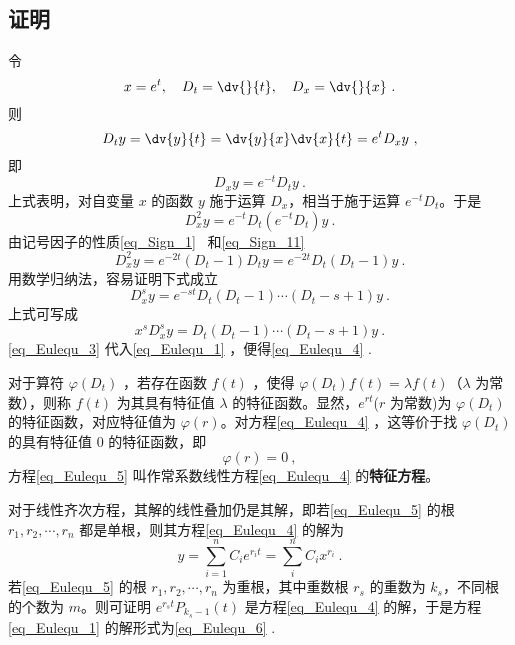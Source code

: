 \subsection{证明}
令
\begin{equation}
x=e^t,\quad D_t=\dv{}{t},\quad D_x=\dv{}{x}~.
\end{equation}
则
\begin{equation}
D_ty=\dv{y}{t}=\dv{y}{x}\dv{x}{t}=e^tD_xy~,
\end{equation}
即
\begin{equation}
D_xy=e^{-t}D_ty~.
\end{equation}
上式表明，对自变量 $x$ 的函数 $y$ 施于运算 $D_x$，相当于施于运算 $e^{-t}D_t$。于是
\begin{equation}
D_x^2y=e^{-t}D_t(e^{-t}D_t)y~.
\end{equation}
由记号因子的性质\autoref{eq_Sign_1}~ 和\autoref{eq_Sign_11}~
\begin{equation}
D_x^2y=e^{-2t}(D_t-1)D_ty=e^{-2t}D_t(D_t-1)y~.
\end{equation}
用数学归纳法，容易证明下式成立
\begin{equation}
D_x^sy=e^{-st}D_t(D_t-1)\cdots (D_t-s+1)y~.
\end{equation}
上式可写成
\begin{equation}\label{eq_Eulequ_3}
x^sD_x^sy=D_t(D_t-1)\cdots (D_t-s+1)y~.
\end{equation}
\autoref{eq_Eulequ_3} 代入\autoref{eq_Eulequ_1} ，便得\autoref{eq_Eulequ_4} .

对于算符 $\varphi(D_t)$ ，若存在函数 $f(t)$ ，使得
$\varphi(D_t)f(t)=\lambda f(t)$（$\lambda$ 为常数），则称 $f(t)$ 为其具有特征值 $\lambda$ 的特征函数。显然，$e^{rt}$($r$ 为常数)为 $\varphi(D_t)$ 的特征函数，对应特征值为 $\varphi(r)$。对方程\autoref{eq_Eulequ_4} ，这等价于找 $\varphi(D_t)$ 的具有特征值 $0$ 的特征函数，即
\begin{equation}\label{eq_Eulequ_5}
\varphi(r)=0~,
\end{equation}
方程\autoref{eq_Eulequ_5} 叫作常系数线性方程\autoref{eq_Eulequ_4} 的\textbf{特征方程}。

对于线性齐次方程，其解的线性叠加仍是其解，即若\autoref{eq_Eulequ_5} 的根 $r_1,r_2,\cdots,r_n$ 都是单根，则其方程\autoref{eq_Eulequ_4} 的解为
\begin{equation}
y=\sum_{i=1}^{n}C_ie^{r_it}=\sum_i^{n}C_ix^{r_i}~.
\end{equation}
 若\autoref{eq_Eulequ_5} 的根 $r_1,r_2,\cdots,r_n$ 为重根，其中重数根 $r_s$ 的重数为 $k_s$，不同根的个数为 $m$。则可证明 $e^{r_st}P_{k_s-1}(t)$ 是方程\autoref{eq_Eulequ_4} 的解，于是方程\autoref{eq_Eulequ_1} 的解形式为\autoref{eq_Eulequ_6} .
